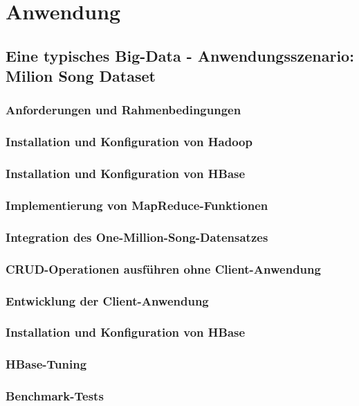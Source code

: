 \chapter{Anwendung}
\section{Eine typisches Big-Data -  Anwendungsszenario: Milion Song Dataset}
\subsection{Anforderungen und Rahmenbedingungen}
\subsection{Installation und Konfiguration von Hadoop}
\subsection{Installation und Konfiguration von HBase}
\subsection{Implementierung von MapReduce-Funktionen}
\subsection{Integration des One-Million-Song-Datensatzes}
\subsection{CRUD-Operationen ausführen ohne Client-Anwendung}
\subsection{Entwicklung der Client-Anwendung}
\subsection{Installation und Konfiguration von HBase}
\subsection{HBase-Tuning}
\subsection{Benchmark-Tests}
